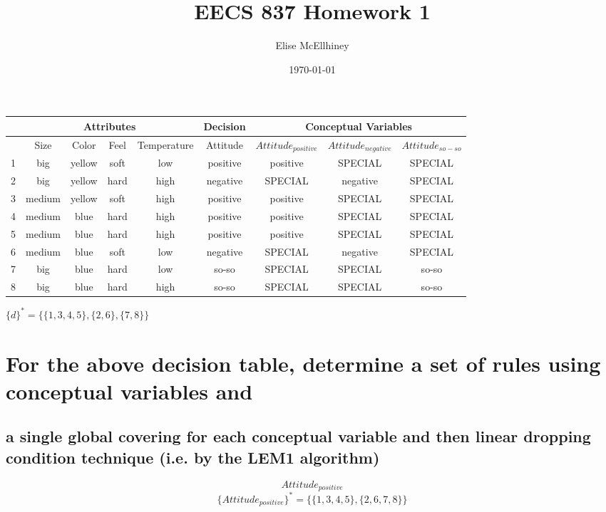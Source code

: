 \documentclass[10pt]{amsart}
\title{EECS 837 Homework 1}
\author{Elise McEllhiney}
\date{\today}                                           %
\begin{document}
\maketitle

\begin{center}
\begin{tabular}{ | c | c | c | c | c | c | c | c | c |}
\hline
 & \multicolumn{4}{|c|}{Attributes} & Decision & \multicolumn{3}{|c|}{Conceptual Variables} \\
 \hline
 & Size & Color & Feel & Temperature & Attitude & $Attitude_{positive}$ & $Attitude_{negative}$ & $Attitude_{so-so}$ \\
 \hline
 1 & big & yellow & soft & low & positive & positive & SPECIAL & SPECIAL \\ 
 2 & big & yellow & hard & high & negative & SPECIAL & negative & SPECIAL\\  
 3 & medium & yellow & soft & high & positive & positive & SPECIAL & SPECIAL\\  
 4 & medium & blue & hard & high & positive & positive & SPECIAL & SPECIAL\\ 
 5 & medium & blue & hard & high & positive & positive & SPECIAL & SPECIAL\\ 
 6 & medium & blue & soft & low & negative & SPECIAL & negative & SPECIAL \\ 
 7 & big & blue & hard & low & so-so & SPECIAL & SPECIAL & so-so \\
 8 & big & blue & hard & high & so-so & SPECIAL & SPECIAL & so-so \\
 \hline 
\end{tabular}

$\{ d \}^* = \{  \{ 1, 3, 4, 5 \}, \{ 2, 6 \}, \{ 7, 8 \} \}$

\end{center}

\section{For the above decision table, determine a set of rules using conceptual variables and}
\subsection{a single global covering for each conceptual variable and then linear dropping condition technique (i.e. by the LEM1 algorithm)}

$$Attitude_{positive}$$
$$\{ Attitude_{positive} \}^* = \{\{1,3,4,5\},\{2,6,7,8\}\}$$
\end{document}
